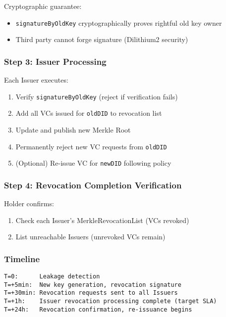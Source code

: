 Cryptographic guarantee:
\begin{itemize}
  \item \texttt{signatureByOldKey} cryptographically proves rightful old key owner
  \item Third party cannot forge signature (Dilithium2 security)
\end{itemize}

\subsubsection{Step 3: Issuer Processing}

Each Issuer executes:

\begin{enumerate}
  \item Verify \texttt{signatureByOldKey} (reject if verification fails)
  \item Add all VCs issued for \texttt{oldDID} to revocation list
  \item Update and publish new Merkle Root
  \item Permanently reject new VC requests from \texttt{oldDID}
  \item (Optional) Re-issue VC for \texttt{newDID} following policy
\end{enumerate}

\subsubsection{Step 4: Revocation Completion Verification}

Holder confirms:

\begin{enumerate}
  \item Check each Issuer's MerkleRevocationList (VCs revoked)
  \item List unreachable Issuers (unrevoked VCs remain)
\end{enumerate}

\subsubsection{Timeline}

\begin{verbatim}
T=0:      Leakage detection
T=+5min:  New key generation, revocation signature
T=+30min: Revocation requests sent to all Issuers
T=+1h:    Issuer revocation processing complete (target SLA)
T=+24h:   Revocation confirmation, re-issuance begins
\end{verbatim}

